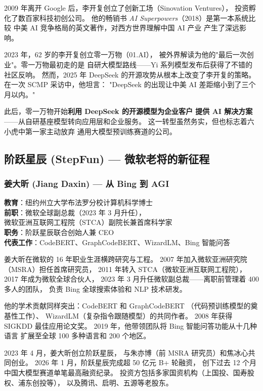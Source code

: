 2009 年离开 Google 后，李开复创立了创新工场（Sinovation Ventures），
投资孵化了数百家科技初创公司。
他的畅销书 \textit{AI Superpowers}（2018）是第一本系统比较
中美 AI 竞争格局的英文著作，对西方世界理解中国 AI 产业
产生了深远影响。

2023 年，62 岁的李开复创立零一万物（01.AI），
被外界解读为他的"最后一次创业"。零一万物最初走的是
自研大模型路线——Yi 系列模型发布后获得了不错的社区反响。
然而，2025 年 DeepSeek 的开源攻势从根本上改变了李开复的策略。
在一次 SCMP 采访中，他坦言：
"DeepSeek 的出现让中美 AI 差距缩小到了三个月以内。"

此后，零一万物开始\textbf{利用 DeepSeek 的开源模型为企业客户
提供 AI 解决方案}——从自研基座模型转向应用层和企业服务。
这一转型虽然务实，但也标志着六小虎中第一家主动放弃
通用大模型预训练赛道的公司。


\subsection{阶跃星辰 (StepFun) — 微软老将的新征程}

\subsubsection{姜大昕 (Jiang Daxin) — 从 Bing 到 AGI}

\begin{keybox}
\textbf{教育}：纽约州立大学布法罗分校计算机科学博士 \\
\textbf{前职}：微软全球副总裁（2023 年 3 月升任），\\
\quad 微软亚洲互联网工程院（STCA）副院长兼首席科学家 \\
\textbf{职务}：阶跃星辰联合创始人兼 CEO \\
\textbf{代表工作}：CodeBERT、GraphCodeBERT、WizardLM、Bing 智能问答
\end{keybox}

姜大昕在微软的 16 年职业生涯横跨研究与工程。
2007 年加入微软亚洲研究院（MSRA）担任首席研究员，
2011 年转入 STCA（微软亚洲互联网工程院），
2017 年成为微软全球合伙人，
2023 年 3 月升任微软副总裁——离职前管理着 400 多人的团队，
负责 Bing 全球搜索体验和 NLP 技术研发。

他的学术贡献同样突出：CodeBERT 和 GraphCodeBERT
（代码预训练模型的奠基性工作）、
WizardLM（复杂指令跟随模型）的共同作者。
2008 年获得 SIGKDD 最佳应用论文奖。
2019 年，他带领团队将 Bing 智能问答功能从十几种语言
扩展至全球 100 多种语言和 200 个地区。

2023 年 4 月，姜大昕创立阶跃星辰，
与朱亦博（前 MSRA 研究员）和焦冰心共同创业。
2026 年 1 月，阶跃星辰完成超 50 亿元 B+ 轮融资，
创下过去 12 个月中国大模型赛道单笔最高融资纪录。
投资方包括多家国资机构（上国投、国寿股权、浦东创投等），
以及腾讯、启明、五源等老股东。

